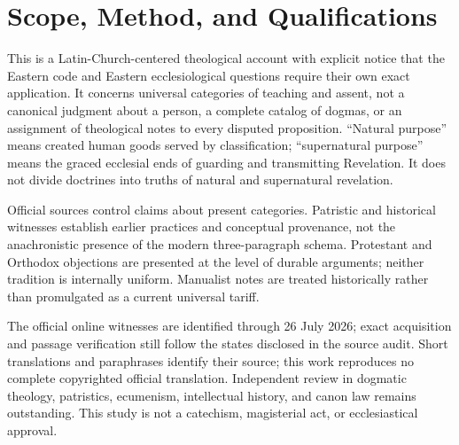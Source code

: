 \section{Scope, Method, and Qualifications}

This is a Latin-Church-centered theological account with explicit notice that
the Eastern code and Eastern ecclesiological questions require their own exact
application. It concerns universal categories of teaching and assent, not a
canonical judgment about a person, a complete catalog of dogmas, or an
assignment of theological notes to every disputed proposition. ``Natural
purpose'' means created human goods served by classification; ``supernatural
purpose'' means the graced ecclesial ends of guarding and transmitting
Revelation. It does not divide doctrines into truths of natural and
supernatural revelation.

Official sources control claims about present categories. Patristic and
historical witnesses establish earlier practices and conceptual provenance,
not the anachronistic presence of the modern three-paragraph schema. Protestant
and Orthodox objections are presented at the level of durable arguments;
neither tradition is internally uniform. Manualist notes are treated
historically rather than promulgated as a current universal tariff.

The official online witnesses are identified through 26 July 2026; exact
acquisition and passage verification still follow the states disclosed in the
source audit. Short
translations and paraphrases identify their source; this work reproduces no
complete copyrighted official translation. Independent review in dogmatic
theology, patristics, ecumenism, intellectual history, and canon law remains
outstanding. This study is not a catechism, magisterial act, or ecclesiastical
approval.

